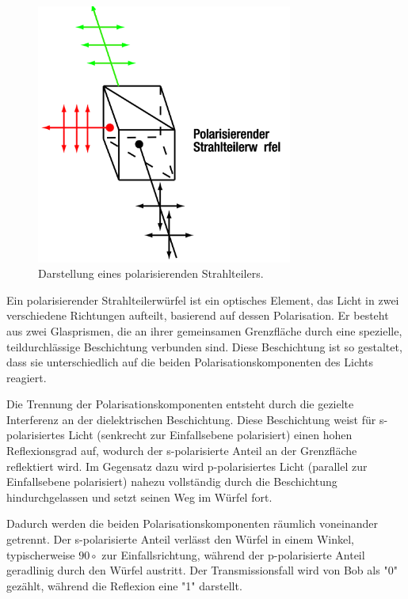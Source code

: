\begin{figure}[H]
	\centering
	\includegraphics[width=0.75\textwidth]{content/grafik/Strahlteiler.png}
	\caption{Darstellung eines polarisierenden Strahlteilers. \cite{krypt}}
	\label{fig:Strahlteiler}
\end{figure}
Ein polarisierender Strahlteilerwürfel ist ein optisches Element, das Licht in zwei verschiedene Richtungen aufteilt, basierend auf dessen Polarisation. Er besteht aus zwei Glasprismen, die an ihrer gemeinsamen Grenzfläche durch eine spezielle, teildurchlässige Beschichtung verbunden sind. Diese Beschichtung ist so gestaltet, dass sie unterschiedlich auf die beiden Polarisationskomponenten des Lichts reagiert.

Die Trennung der Polarisationskomponenten entsteht durch die gezielte Interferenz an der dielektrischen Beschichtung. Diese Beschichtung weist für s-polarisiertes Licht (senkrecht zur Einfallsebene polarisiert) einen hohen Reflexionsgrad auf, wodurch der s-polarisierte Anteil an der Grenzfläche reflektiert wird. Im Gegensatz dazu wird p-polarisiertes Licht (parallel zur Einfallsebene polarisiert) nahezu vollständig durch die Beschichtung hindurchgelassen und setzt seinen Weg im Würfel fort.

Dadurch werden die beiden Polarisationskomponenten räumlich voneinander getrennt. Der s-polarisierte Anteil verlässt den Würfel in einem Winkel, typischerweise $90\circ$ zur Einfallsrichtung, während der p-polarisierte Anteil geradlinig durch den Würfel austritt.
Der Transmissionsfall wird von Bob als "0" gezählt, während die Reflexion eine "1" darstellt.

